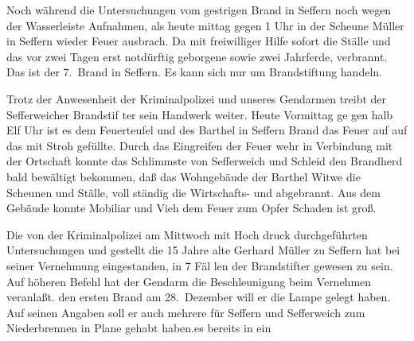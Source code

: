 

%
Noch während die Untersuchungen vom gestrigen\ob
Brand in Seffern noch wegen der Wasserleiste\unsicher\ob
Aufnahmen, als heute mittag gegen 1 Uhr in der\ob
Scheune Müller in Seffern wieder Feuer ausbrach.\ob
Da mit freiwilliger Hilfe sofort die Ställe und\ob
das vor zwei Tagen erst notdürftig geborgene\unsicher{} sowie\ob
zwei Jahrferde,\unsicher{} verbrannt. Das ist der 7.\ Brand\ob
in Seffern. Es kann sich nur um Brandstiftung\ob
handeln.

%
Trotz der Anwesenheit der Kriminalpolizei und\ob
unseres Gendarmen treibt der Sefferweicher Brandstif\ohb
ter sein Handwerk weiter. Heute Vormittag ge\ohb
gen halb Elf Uhr ist es dem Feuerteufel und\unsicher\ob
des\unsicher{} Barthel in Seffern\unsicher{} Brand das Feuer\unsicher{} auf\ob
auf das mit Stroh gefüllte. Durch das Eingreifen der Feuer\ohb
wehr in Verbindung mit der Ortschaft konnte das\ob
Schlimmste von Sefferweich und Schleid den Brandherd bald\ob
bewältigt bekommen, daß das Wohngebäude der\ob
Barthel Witwe die Scheunen und Ställe,\unsicher{} voll\ohb
ständig die Wirtschafts- und abgebrannt. Aus dem\ob
Gebäude konnte\unsicher{} Mobiliar und Vieh dem Feuer zum\ob
Opfer\unsicher{} Schaden ist groß.

%
Die von der Kriminalpolizei am Mittwoch mit Hoch\ohb
druck\unsicher{} durchgeführten Untersuchungen und\ob
\unsicher gestellt die 15 Jahre alte Gerhard Müller zu Seffern\ob
hat bei seiner Vernehmung eingestanden, in 7 Fäl\ohb
len der Brandstifter gewesen zu sein. Auf höheren\ob
Befehl hat der Gendarm die Beschleunigung beim\ob
Vernehmen\unsicher{} veranlaßt.\unsicher{} den ersten Brand\ob
am 28.\ Dezember will er die Lampe gelegt haben.\ob
Auf seinen Angaben soll er auch mehrere\unsicher{} für\ob
Seffern und Sefferweich\unsicher{} zum Niederbrennen in\ob
Plane gehabt haben.\unsicher{}\unsicher es bereits in\unsicher{} ein
\pend

